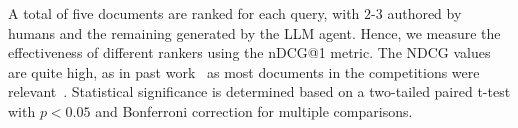 
A total of five documents are ranked for each query, with $2$-$3$ authored by humans and the remaining generated by the LLM agent. 
Hence, we measure the effectiveness of different rankers using the nDCG@1 metric. 
The NDCG values are quite high, as in past work~\cite{Ziv-Ranker} as most documents in the competitions were relevant~\cite{Nimrod, MultQueries}.
Statistical significance is determined based on a two-tailed paired t-test with $p < 0.05$ and Bonferroni correction for multiple comparisons.

